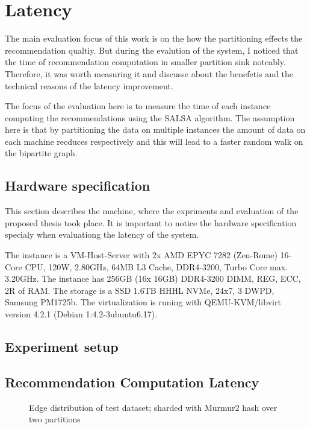 \section{Latency}
\label{sec:eval-latency}
The main evaluation focus of this work is on the how the partitioning effects the recommendation qualtiy. But during the evalution of the system, I noticed that the time of recommendation computation in smaller partition sink noteably. Therefore, it was worth measuring it and discusse about the benefetis and the technical reasons of the latency improvement.


The focus of the evaluation here is to measure the time of each instance computing the recommendations using the SALSA algorithm. The assumption here is that by partitioning the data on multiple instances the amount of data on each machine recduces respectively and this will lead to a faster random walk on the bipartite graph. 

\subsection{Hardware specification}
\label{subsec:hardware-spec}
This section describes the machine, where the expriments and evaluation of the proposed thesis took place. It is important to notice the hardware specification specialy when evaluationg the latency of the system.

The instance is a VM-Host-Server with 2x AMD EPYC 7282 (Zen-Rome) 16-Core CPU, 120W, 2.80GHz, 64MB L3 Cache, DDR4-3200, Turbo Core max. 3.20GHz. The instance has 256GB (16x 16GB) DDR4-3200 DIMM, REG, ECC, 2R of RAM. The storage is a SSD 1.6TB HHHL NVMe, 24x7, 3 DWPD, Samsung PM1725b. The virtualization is runing with  QEMU-KVM/libvirt version 4.2.1 (Debian 1:4.2-3ubuntu6.17).


\subsection{Experiment setup}
\label{subsec:latency-experiment-setup}

\subsection{Recommendation Computation Latency}
\label{subsec:recommendation-computation-latency}


\begin{figure}[h!]
	\centering
	
	\caption{Edge distribution of test dataset; sharded with Murmur2 hash over two partitions}
	\label{plot:edge-distribution-murmur2}
\end{figure}

